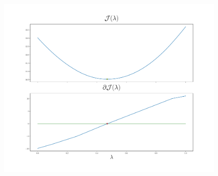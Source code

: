 \documentclass[aspectratio=43]{beamer}
\newtheorem{proposition}[theorem]{Proposicion}
\newcommand{\mymax}[1]{\max\left(#1\right)}
\newcommand{\mymin}[1]{\min\left(#1\right)}
\newcommand{\npertask}{m}
\begin{document}
\begin{frame}
\end{frame}

\begin{frame}

      \begin{figure}[t!]
            \centering
            \includegraphics[width=.6\textwidth]{Chapter4/NeuroCom2021/ejemplo2_sqhinge.pdf}
            \label{fig:sq_error}
        \end{figure}      

\end{frame}
\end{document}
